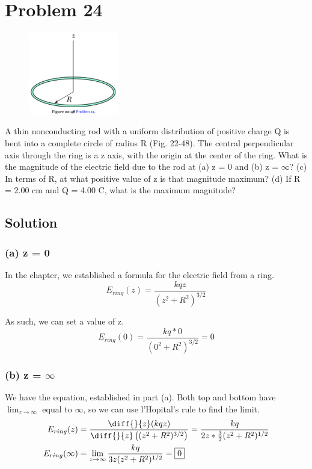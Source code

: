 \documentclass[12pt]{article}
\begin{document}
\pagebreak
\section{Problem 24}
\begin{figure}
    \vspace{-30pt}
    \includegraphics[width=0.35\textwidth]{picture_5.png} 
\end{figure}
A thin nonconducting rod with a uniform distribution of positive charge Q is bent into a complete circle of radius R (Fig. 22-48). The central perpendicular axis through the ring is a z axis, with the origin at the center of the ring. What is the magnitude of the electric field due to the rod at (a) z = 0 and (b) z = $\infty$? (c) In terms of R, at what positive value of z is that magnitude maximum? (d) If R = 2.00 cm and Q = 4.00 C, what is the maximum magnitude?

\subsection*{Solution}
\subsubsection*{(a) z = 0}
In the chapter, we established a formula for the electric field from a ring.
\begin{equation*}
    E_{ring}(z) =   \frac{kqz}{(z^2 + R^2)^{3/2}}
\end{equation*}

As such, we can set a value of z.
\begin{equation*}
    E_{ring}(0) =   \frac{kq*0}{(0^2 + R^2)^{3/2}}
        =   \boxed{0}
\end{equation*}

\subsubsection*{(b) z = $\infty$}
We have the equation, established in part (a). Both top and bottom have $\lim_{z\rightarrow\infty}$ equal to $\infty$, so we can use l'Hopital's rule to find the limit.
\begin{align*}
    E_{ring}(z) &=  \frac{\diff{}{z}(kqz)}{\diff{}{z}\left((z^2 + R^2)^{3/2}\right)}
        =   \frac{kq}{2z * \frac{3}{2}(z^2 + R^2)^{1/2}}\\
    E_{ring}(\infty)    &=  \lim_{z\rightarrow\infty} \frac{kq}{3z (z^2 + R^2)^{1/2}}
        =   \boxed{0}
\end{align*}
\end{document}
